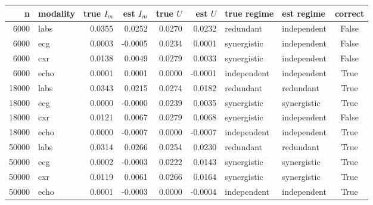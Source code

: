 \begin{tabular}{rlrrrrllc}
\toprule
\textbf{n} & \textbf{modality} & \textbf{true $I_m$} & \textbf{est $I_m$} & \textbf{true $U$} & \textbf{est $U$} & \textbf{true regime} & \textbf{est regime} & \textbf{correct} \\
\midrule
6000 & labs & 0.0355 & 0.0252 & 0.0270 & 0.0232 & redundant & independent & False \\
6000 & ecg & 0.0003 & -0.0005 & 0.0234 & 0.0001 & synergistic & independent & False \\
6000 & cxr & 0.0138 & 0.0049 & 0.0279 & 0.0033 & synergistic & independent & False \\
6000 & echo & 0.0001 & 0.0001 & 0.0000 & -0.0001 & independent & independent & True \\
18000 & labs & 0.0343 & 0.0215 & 0.0274 & 0.0182 & redundant & redundant & True \\
18000 & ecg & 0.0000 & -0.0000 & 0.0239 & 0.0035 & synergistic & synergistic & True \\
18000 & cxr & 0.0121 & 0.0067 & 0.0279 & 0.0068 & synergistic & independent & False \\
18000 & echo & 0.0000 & -0.0007 & 0.0000 & -0.0007 & independent & independent & True \\
50000 & labs & 0.0314 & 0.0266 & 0.0254 & 0.0230 & redundant & redundant & True \\
50000 & ecg & 0.0002 & -0.0003 & 0.0222 & 0.0143 & synergistic & synergistic & True \\
50000 & cxr & 0.0119 & 0.0061 & 0.0266 & 0.0164 & synergistic & synergistic & True \\
50000 & echo & 0.0001 & -0.0003 & 0.0000 & -0.0004 & independent & independent & True \\
\bottomrule
\end{tabular}

